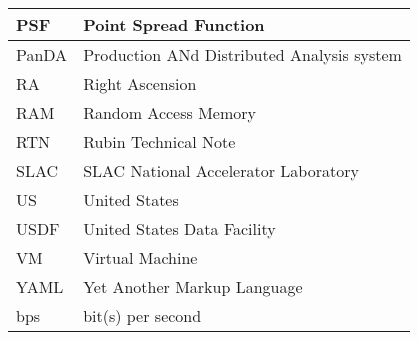 \begin{longtable}{p{}p{}}
PSF & Point Spread Function \\\hline
PanDA &  Production ANd Distributed Analysis system \\\hline
RA & Right Ascension \\\hline
RAM & Random Access Memory \\\hline
RTN & Rubin Technical Note \\\hline
SLAC & SLAC National Accelerator Laboratory \\\hline
US & United States \\\hline
USDF & United States Data Facility \\\hline
VM & Virtual Machine \\\hline
YAML & Yet Another Markup Language \\\hline
bps & bit(s) per second \\\hline
\end{longtable}
